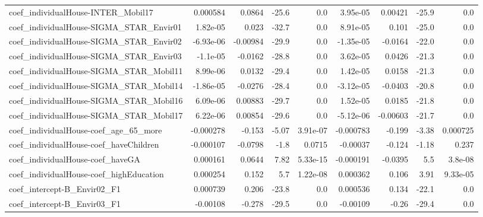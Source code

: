 \begin{tabular}{lrrrrrrrr}
coef\_individualHouse-INTER\_Mobil17        &    0.000584 &       0.0864 &   -25.6 &      0.0 &   3.95e-05 &     0.00421 &        -25.9 &           0.0 \\
coef\_individualHouse-SIGMA\_STAR\_Envir01   &    1.82e-05 &        0.023 &   -32.7 &      0.0 &   8.91e-05 &       0.101 &        -25.0 &           0.0 \\
coef\_individualHouse-SIGMA\_STAR\_Envir02   &   -6.93e-06 &     -0.00984 &   -29.9 &      0.0 &  -1.35e-05 &     -0.0164 &        -22.0 &           0.0 \\
coef\_individualHouse-SIGMA\_STAR\_Envir03   &    -1.1e-05 &      -0.0162 &   -28.8 &      0.0 &   3.62e-05 &      0.0426 &        -21.3 &           0.0 \\
coef\_individualHouse-SIGMA\_STAR\_Mobil11   &    8.99e-06 &       0.0132 &   -29.4 &      0.0 &   1.42e-05 &      0.0158 &        -21.3 &           0.0 \\
coef\_individualHouse-SIGMA\_STAR\_Mobil14   &   -1.86e-05 &      -0.0276 &   -28.4 &      0.0 &  -3.12e-05 &     -0.0403 &        -20.8 &           0.0 \\
coef\_individualHouse-SIGMA\_STAR\_Mobil16   &    6.09e-06 &      0.00883 &   -29.7 &      0.0 &   1.52e-05 &      0.0185 &        -21.8 &           0.0 \\
coef\_individualHouse-SIGMA\_STAR\_Mobil17   &    6.22e-06 &      0.00854 &   -29.6 &      0.0 &  -5.12e-06 &    -0.00603 &        -21.7 &           0.0 \\
coef\_individualHouse-coef\_age\_65\_more     &   -0.000278 &       -0.153 &   -5.07 & 3.91e-07 &  -0.000783 &      -0.199 &        -3.38 &      0.000725 \\
coef\_individualHouse-coef\_haveChildren    &   -0.000107 &      -0.0798 &    -1.8 &   0.0715 &   -0.00037 &      -0.124 &        -1.18 &         0.237 \\
coef\_individualHouse-coef\_haveGA          &    0.000161 &       0.0644 &    7.82 & 5.33e-15 &  -0.000191 &     -0.0395 &          5.5 &       3.8e-08 \\
coef\_individualHouse-coef\_highEducation   &    0.000254 &        0.152 &     5.7 & 1.22e-08 &   0.000362 &       0.106 &         3.91 &      9.33e-05 \\
coef\_intercept-B\_Envir02\_F1               &    0.000739 &        0.206 &   -23.8 &      0.0 &   0.000536 &       0.134 &        -22.1 &           0.0 \\
coef\_intercept-B\_Envir03\_F1               &    -0.00108 &       -0.278 &   -29.5 &      0.0 &   -0.00109 &       -0.26 &        -29.4 &           0.0 \\

\end{tabular}
